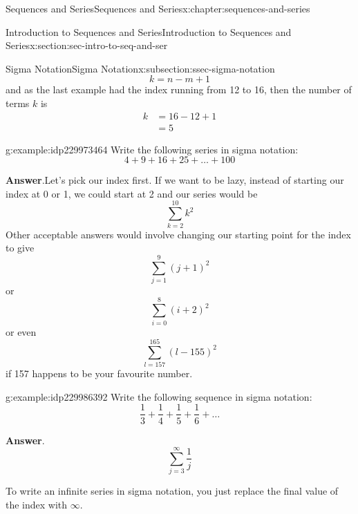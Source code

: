 \documentclass[twoside,10pt,]{book}
\newcommand{\blocktitlefont}{\relax}
\numberwithin{equation}{section}
\newcommand{\amp}{&}
\begin{document}
\begin{chapterptx}{Sequences and Series}{}{Sequences and Series}{}{}{x:chapter:sequences-and-series}
\begin{sectionptx}{Introduction to Sequences and Series}{}{Introduction to Sequences and Series}{}{}{x:section:sec-intro-to-seq-and-ser}
\begin{subsectionptx}{Sigma Notation}{}{Sigma Notation}{}{}{x:subsection:ssec-sigma-notation}
\begin{equation*}
k = n - m + 1
\end{equation*}
and as the last example had the index running from 12 to 16, then the number of terms \(k\) is%
\begin{align*}
k \amp = 16 - 12 + 1\\
\amp = 5
\end{align*}
\begin{example}{}{g:example:idp229973464}%
Write the following series in sigma notation:%
\begin{equation*}
4 + 9 + 16 + 25 +\ldots + 100
\end{equation*}
\par\smallskip%
\noindent\textbf{\blocktitlefont Answer}.\label{g:answer:idp229982808}{}\hypertarget{g:answer:idp229982808}{}\quad{}Let's pick our index first.  If we want to be lazy, instead of starting our index at 0 or 1, we could start at 2 and our series would be%
\begin{equation*}
\sum\limits_{k = 2}^{10} {{k^2}}
\end{equation*}
Other acceptable answers would involve changing our starting point for the index to give%
\begin{equation*}
\sum\limits_{j = 1}^9 {{{\left( {j + 1} \right)}^2}}
\end{equation*}
or%
\begin{equation*}
\sum\limits_{i = 0}^8 {{{\left( {i + 2} \right)}^2}}
\end{equation*}
or even%
\begin{equation*}
\sum\limits_{l = 157}^{165} {{{\left( {l - 155} \right)}^2}}
\end{equation*}
if 157 happens to be your favourite number.\end{example}
 \begin{example}{}{g:example:idp229986392}%
Write the following sequence in sigma notation:%
\begin{equation*}
\frac{1}{3} + \frac{1}{4} + \frac{1}{5} + \frac{1}{6} + \ldots
\end{equation*}
\par\smallskip%
\noindent\textbf{\blocktitlefont Answer}.\label{g:answer:idp229983448}{}\hypertarget{g:answer:idp229983448}{}\quad{}%
\begin{equation*}
\sum\limits_{j = 3}^\infty  {\frac{1}{j}}
\end{equation*}
\end{example}
%
\par
To write an infinite series in sigma notation, you just replace the final value of the index with \(\infty\).%

\end{subsectionptx}
\end{sectionptx}
\end{chapterptx}
\end{document}
